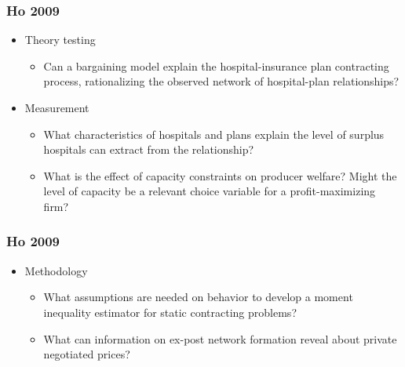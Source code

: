 
\begin{frame}
\frametitle{Ho 2009}

\begin{itemize}
	\item Theory testing
         \begin{itemize}
	\item Can a bargaining model explain the hospital-insurance plan contracting process, rationalizing the observed network of hospital-plan relationships? 	\end{itemize}
	\item Measurement
	\begin{itemize}
	\item What characteristics of hospitals and plans explain the level of surplus hospitals can extract from the relationship?
	\item What is the effect of capacity constraints on producer welfare?  Might the level of capacity be a relevant choice variable for a profit-maximizing firm?
	\end{itemize}
\end{itemize}
\end{frame}


\begin{frame}
\frametitle{Ho 2009}

\begin{itemize}
	\item Methodology
	\begin{itemize}
	\item What assumptions are needed on behavior to develop a moment inequality estimator for static contracting problems?
	\item What can information on ex-post network formation reveal about private negotiated prices?
	\end{itemize}
\end{itemize}
\end{frame}


